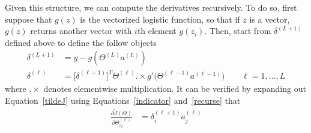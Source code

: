 \documentclass[12pt]{article}
\begin{document}
Given this structure, we can compute the derivatives recursively. To do
so, first suppose that $g(z)$ is the vectorized logistic function, so
that if $z$ is a vector, $g(z)$ returns another vector with $i$th
element $g(z_i)$. Then, start from $\delta^{(L+1)}$ defined above to
define the follow objects
\begin{align*}
  \delta^{(L+1)} &= y - g\left(\Theta^{(L)}a^{(L)}\right)
  \\
  \delta^{(\ell)} &=
  \big[
  \delta^{(\ell+1)}
  \big]^T
  \Theta^{(\ell)}
  .\times
  g'\big(\Theta^{(\ell-1)}a^{(\ell-1)}\big)
  \qquad \ell = 1,\ldots,L
\end{align*}
where $.\times$ denotes elementwise multiplication.
It can be verified by expanding out Equation~\ref{tildeJ} using
Equations~\ref{indicator} and~\ref{recurse} that
\begin{align*}
  \frac{\partial \tilde{J}(\Theta)}{\partial \Theta^{(\ell)}_{ij}}
  &=
  \delta^{(\ell+1)}_i a^{(\ell)}_j
\end{align*}







\end{document}
